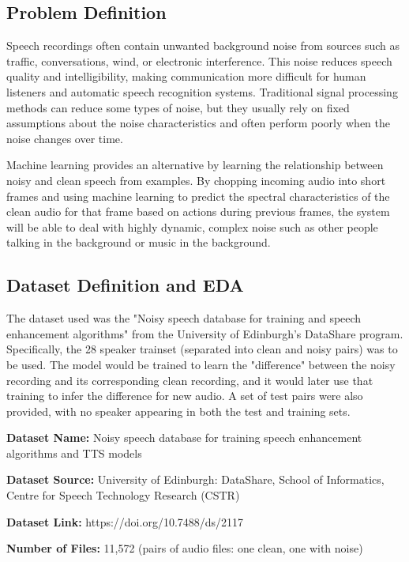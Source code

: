 \documentclass[11pt, letterpaper,titlepage]{article}
\begin{document}
\subsection{Problem Definition}

Speech recordings often contain unwanted background noise from sources such as traffic, conversations, wind, or electronic interference. This noise reduces speech quality and intelligibility, making communication more difficult for human listeners and automatic speech recognition systems. Traditional signal processing methods can reduce some types of noise, but they usually rely on fixed assumptions about the noise characteristics and often perform poorly when the noise changes over time.

Machine learning provides an alternative by learning the relationship between noisy and clean speech from examples. By chopping incoming audio into short frames and using machine learning to predict the spectral characteristics of the clean audio for that frame based on actions during previous frames, the system will be able to deal with highly dynamic, complex noise such as other people talking in the background or music in the background.

\subsection{Dataset Definition and EDA}

The dataset used was the "Noisy speech database for training and speech enhancement algorithms" from the University of Edinburgh's DataShare program. Specifically, the 28 speaker trainset (separated into clean and noisy pairs) was to be used. The model would be trained to learn the "difference" between the noisy recording and its corresponding clean recording, and it would later use that training to infer the difference for new audio. A set of test pairs were also provided, with no speaker appearing in both the test and training sets.

\noindent \textbf{Dataset Name:} Noisy speech database for training speech enhancement algorithms and TTS models

\noindent \textbf{Dataset Source:} University of Edinburgh: DataShare, School of Informatics, Centre for Speech Technology Research (CSTR)

\noindent \textbf{Dataset Link:} https://doi.org/10.7488/ds/2117 

\noindent \textbf{Number of Files:} 11,572 (pairs of audio files: one clean, one with noise)
\end{document}
